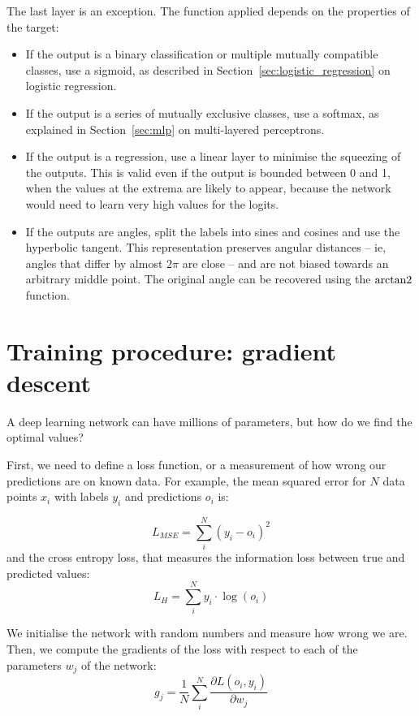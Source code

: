 The last layer is an exception.
The function applied depends on the properties of the target:
\begin{itemize}
\item If the output is a binary classification or multiple mutually compatible classes, use a sigmoid, as described in Section~\ref{sec:logistic_regression} on logistic regression.
\item If the output is a series of mutually exclusive classes, use a softmax, as explained in Section~\ref{sec:mlp} on multi-layered perceptrons.
\item If the output is a regression, use a linear layer to minimise the squeezing of the outputs.
This is valid even if the output is bounded between 0 and 1, when the values at the extrema are likely to appear, because the network would need to learn very high values for the logits.
\item If the outputs are angles, split the labels into sines and cosines and use the hyperbolic tangent.
This representation preserves angular distances -- ie, angles that differ by almost $2 \pi$ are close -- and are not biased towards an arbitrary middle point.
The original angle can be recovered using the $\operatorname{arctan2}$ function.
\end{itemize}

\section[Gradient descent]{Training procedure: gradient descent}\label{sec:grad_descent}
A deep learning network can have millions of parameters, but how do we find the optimal values?

First, we need to define a loss function, or a measurement of how wrong our predictions are on known data.
For example, the mean squared error for $N$ data points  $x_i$ with labels $y_i$ and predictions $o_i$ is:

\begin{equation*}
L_{MSE} = \sum_i^N \left(y_i - o_i\right)^2
\end{equation*}
and the cross entropy loss, that measures the information loss between true and predicted values:
\begin{equation*}
L_{H} = \sum_i^N y_i \cdot \log\left(o_i\right) 
\end{equation*}

We initialise the network with random numbers and measure how wrong we are.
Then, we compute the gradients of the loss with respect to each of the parameters $w_j$ of the network:
\begin{equation*}
g_j = \frac{1}{N}\sum_i^N\frac{\partial L\left(o_i, y_i \right)}{\partial w_j}
\end{equation*}

